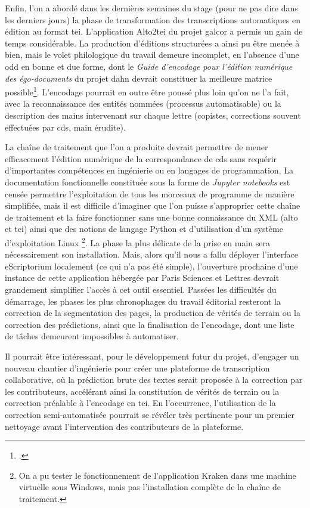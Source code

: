 \documentclass[a4paper,12pt,twoside]{book}
\begin{document}
		Enfin, l'on a abordé dans les dernières semaines du stage (pour ne pas dire dans les derniers jours) la phase de transformation des transcriptions automatiques en édition au format \gls{tei}. L'application Alto2tei du projet \gls{galcor} a permis un gain de temps considérable. La production d'éditions structurées a ainsi pu être menée à bien, mais le volet philologique du travail demeure incomplet, en l'absence d'une \gls{odd} en bonne et due forme, dont le \textit{Guide d'encodage pour l'édition numérique des égo-documents} du projet \gls{dahn} devrait constituer la meilleure matrice possible\footcite{chiffoleauGuideEncodagePour2022}. L'encodage pourrait en outre être poussé plus loin qu'on ne l'a fait, avec la reconnaissance des entités nommées (processus automatisable) ou la description des mains intervenant sur chaque lettre (copistes, corrections souvent effectuées par \gls{cds}, main érudite).
		
		La chaîne de traitement que l'on a produite devrait permettre de mener efficacement l'édition numérique de la correspondance de \gls{cds} sans requérir d'importantes compétences en ingénierie ou en langages de programmation. La documentation fonctionnelle constituée sous la forme de \textit{Jupyter notebooks} est censée permettre l'exploitation de tous les morceaux de programme de manière simplifiée, mais il est difficile d'imaginer que l'on puisse s'approprier cette chaîne de traitement et la faire fonctionner sans une bonne connaissance du XML (\gls{alto} et \gls{tei}) ainsi que des notions de langage Python et d'utilisation d'un système d'exploitation Linux%
		\footnote{
			On a pu tester le fonctionnement de l'application Kraken dans une machine virtuelle sous Windows, mais pas l'installation complète de la chaîne de traitement.
		}.%
		La phase la plus délicate de la prise en main sera nécessairement son installation. Mais, alors qu'il nous a fallu déployer l'interface eScriptorium localement (ce qui n'a pas été simple), l'ouverture prochaine d'une instance de cette application hébergée par Paris Sciences et Lettres devrait grandement simplifier l'accès à cet outil essentiel.
		Passées les difficultés du démarrage, les phases les plus chronophages du travail éditorial resteront la correction de la \gls{segmentation} des pages, la production de vérités de terrain ou la correction des \glspl{prédiction}, ainsi que la finalisation de l'encodage, dont une liste de tâches demeurent impossibles à automatiser.
		
		Il pourrait être intéressant, pour le développement futur du projet, d'engager un nouveau chantier d'ingénierie pour créer une plateforme de transcription collaborative, où la prédiction brute des textes serait proposée à la correction par les contributeurs, accélérant ainsi la constitution de vérités de terrain ou la correction préalable à l'encodage en \gls{tei}. En l'occurrence, l'utilisation de la correction semi-automatisée pourrait se révéler très pertinente pour un premier nettoyage avant l'intervention des contributeurs de la plateforme.
		
\end{document}
